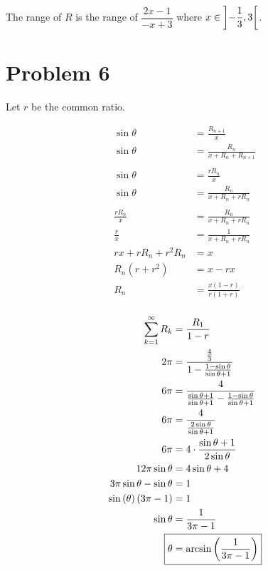 \documentclass{article}
\begin{document}
The range of $R$ is the range of $\dfrac{2x-1}{-x+3}$ where
$x\in\interval[scaled,open left,open right]{-\dfrac{1}{3}}{3}$.

\pagebreak
\section*{Problem 6}
Let $r$ be the common ratio.

\centering
\begin{minipage}[t]{0.42\linewidth}
\begin{align*}
	\sin\theta&=\frac{R_{n+1}}{x} \\
	\sin\theta&=\frac{R_n}{x+R_n+R_{n+1}} \\
	\\
	\sin\theta&=\frac{rR_n}{x} \\
	\sin\theta&=\frac{R_n}{x+R_n+rR_n} \\
	\\
	\frac{rR_n}{x}&=\frac{R_n}{x+R_n+rR_n} \\
	\frac{r}{x}&=\frac{1}{x+R_n+rR_n} \\
	rx+rR_n+r^2R_n&=x \\
	R_n(r+r^2)&=x-rx \\
	R_n&=\frac{x(1-r)}{r(1+r)} \\
\end{align*}

\begin{align*}
	\sum_{k=1}^{\infty}R_k&=\frac{R_1}{1-r} \\
	2\pi&=\frac{\frac{4}{3}}{1-\frac{1-\sin\theta}{\sin\theta+1}} \\
	6\pi&=\frac{4}{\frac{\sin\theta+1}{\sin\theta+1}-
		\frac{1-\sin\theta}{\sin\theta+1}} \\
	6\pi&=\frac{4}{\frac{2\sin\theta}{\sin\theta+1}} \\
	6\pi&=4\cdot\frac{\sin\theta+1}{2\sin\theta} \\
	12\pi\sin\theta&=4\sin\theta+4 \\
	3\pi\sin\theta-\sin\theta&=1 \\
	\sin\left(\theta\right)\left(3\pi-1\right)&=1 \\
	\sin\theta&=\frac{1}{3\pi-1} \\
	\Aboxed{\theta&=\arcsin\left(\frac{1}{3\pi-1}\right)}
\end{align*}
\end{minipage}
\end{document}
